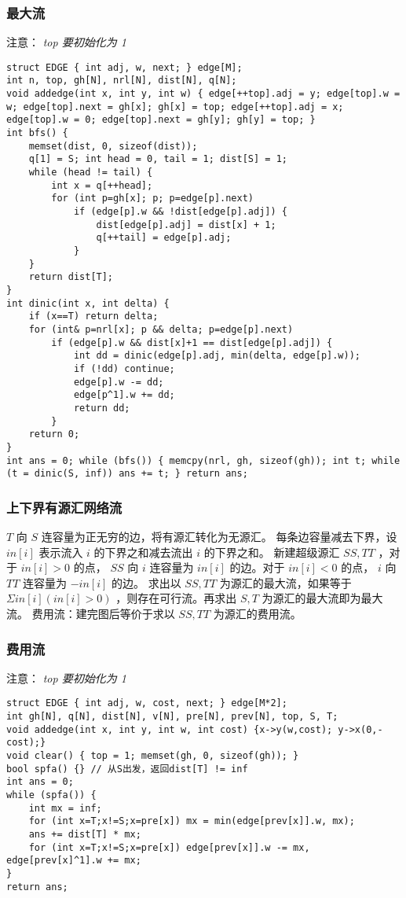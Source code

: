 \documentclass[landscape,a4paper]{article}
\begin{document}
\subsubsection{最大流}
注意： \emph{top 要初始化为 1}
\begin{lstlisting}
struct EDGE { int adj, w, next; } edge[M];
int n, top, gh[N], nrl[N], dist[N], q[N];
void addedge(int x, int y, int w) { edge[++top].adj = y; edge[top].w = w; edge[top].next = gh[x]; gh[x] = top; edge[++top].adj = x; edge[top].w = 0; edge[top].next = gh[y]; gh[y] = top; }
int bfs() {
	memset(dist, 0, sizeof(dist));
	q[1] = S; int head = 0, tail = 1; dist[S] = 1;
	while (head != tail) {
		int x = q[++head];
		for (int p=gh[x]; p; p=edge[p].next)
			if (edge[p].w && !dist[edge[p].adj]) {
				dist[edge[p].adj] = dist[x] + 1;
				q[++tail] = edge[p].adj;
			}
	}
	return dist[T];
}
int dinic(int x, int delta) {
	if (x==T) return delta;
	for (int& p=nrl[x]; p && delta; p=edge[p].next)
		if (edge[p].w && dist[x]+1 == dist[edge[p].adj]) {
			int dd = dinic(edge[p].adj, min(delta, edge[p].w));
			if (!dd) continue;
			edge[p].w -= dd;
			edge[p^1].w += dd;
			return dd;
		}
	return 0;
}
int ans = 0; while (bfs()) { memcpy(nrl, gh, sizeof(gh)); int t; while (t = dinic(S, inf)) ans += t; } return ans;
\end{lstlisting}
\subsubsection{上下界有源汇网络流}

$T$ 向 $S$ 连容量为正无穷的边，将有源汇转化为无源汇。
每条边容量减去下界，设 $in[i]$ 表示流入 $i$ 的下界之和减去流出 $i$ 的下界之和。  
新建超级源汇 $SS, TT$ ，对于 $in[i] > 0$ 的点， $SS$ 向 $i$ 连容量为 $in[i]$ 的边。对于 $in[i] < 0$ 的点， $i$ 向 $TT$ 连容量为 $-in[i]$ 的边。 
求出以 $SS, TT$ 为源汇的最大流，如果等于 $\Sigma in[i] (in[i]>0)$ ，则存在可行流。再求出 $S, T$ 为源汇的最大流即为最大流。 
费用流：建完图后等价于求以 $SS, TT$ 为源汇的费用流。

\subsubsection{费用流}
注意： \emph{top 要初始化为 1}
\begin{lstlisting}
struct EDGE { int adj, w, cost, next; } edge[M*2];
int gh[N], q[N], dist[N], v[N], pre[N], prev[N], top, S, T;
void addedge(int x, int y, int w, int cost) {x->y(w,cost); y->x(0,-cost);}
void clear() { top = 1; memset(gh, 0, sizeof(gh)); }
bool spfa() {} // 从S出发，返回dist[T] != inf
int ans = 0;
while (spfa()) {
	int mx = inf;
	for (int x=T;x!=S;x=pre[x]) mx = min(edge[prev[x]].w, mx);
	ans += dist[T] * mx; 
	for (int x=T;x!=S;x=pre[x]) edge[prev[x]].w -= mx, edge[prev[x]^1].w += mx;
}
return ans;
\end{lstlisting}
\end{document}
